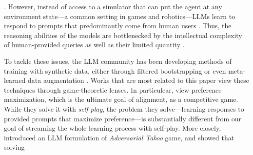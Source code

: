 \documentclass[]{fairmeta}
\begin{document}
\citep{christiano2017deep, achiam2023gpt, bubeck2023sparks, rafailov2023direct, team2023gemini, shao2024deepseekmath, guo2025deepseek}.
However, instead of access to a simulator that can put the agent at any 
environment state---a common setting in games and robotics---LLMs learn to respond to prompts that predominantly come from human users \citep{achiam2023gpt, team2023gemini, guo2025deepseek}. 
Thus, the reasoning abilities of the models are bottlenecked by the intellectual complexity of 
human-provided queries as well as their limited quantity \citep{villalobos2022will, silver2025welcome}.



To tackle these issues, the LLM community has been developing methods of training with synthetic data, either through filtered bootstrapping \citep{huang2022large, wang2022self, setlur2024rl} or even 
meta-learned data augmentation \citep{zweiger2025self, calian2025datarater}.
Works that are most related to this paper view these techniques through game-theoretic lenses. 
In particulear, \citet{wu2024self} view preference maximization, which is the ultimate goal of alignment, as a competitive game.
While they solve it
with \emph{self-play}, the problem they solve---learning responses to provided prompts that maximize preference---is substantially different from our goal of streaming the whole 
learning process with self-play.
More closely, \citet{cheng2024self} introduced an LLM formulation of \emph{Adversarial Taboo} game, and showed that solving 
\end{document}
